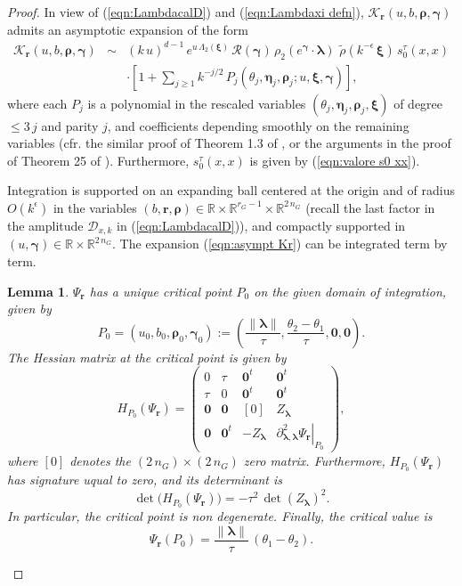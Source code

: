 \documentclass[12pt,a4paper]{article}
\theoremstyle{plain}
\newtheorem{lem}[thm]{Lemma}%
\theoremstyle{definition}
\begin{document}
\begin{proof}
In view of (\ref{eqn:LambdacalD}) and (\ref{eqn:Lambdaxi defn}),
$\mathcal{K}_{\mathbf{r}}\left(u,b,\boldsymbol{\rho},
\boldsymbol{\gamma} \right)$ admits an asymptotic expansion of the
form
\begin{eqnarray}
\label{eqn:asympt Kr}
\mathcal{K}_{\mathbf{r}}\left(u,b,\boldsymbol{\rho},
\boldsymbol{\gamma} \right)&\sim&(k\,u)^{d-1}\,
e^{u\,\Lambda_2 (\boldsymbol{\xi})}\,\mathcal{R}(\boldsymbol{\gamma})\,
\rho_2(e^{\boldsymbol{\gamma}}\cdot \boldsymbol{\lambda})\,
\,\tilde{\rho}\left(k^{-\epsilon}\,\boldsymbol{\xi}\right)\,
s_0^\tau(x,x)\nonumber\\
&&\cdot \left[1+\sum_{j\ge 1}k^{-j/2}\,P_j(\theta_j,\boldsymbol{\eta}_j,\boldsymbol{\rho}_j;u,
\boldsymbol{\xi},\boldsymbol{\gamma})\right],
\end{eqnarray}
where each $P_j$ is a polynomial in the rescaled variables
$(\theta_j,\boldsymbol{\eta}_j,\boldsymbol{\rho}_j,
\boldsymbol{\xi})$ of degree $\le 3\,j$ and parity $j$,
and coefficients depending smoothly on the remaining variables
(cfr. the similar proof of Theorem 1.3 of \cite{p22},
or the arguments in the proof of Theorem 25 of \cite{gp24}).
Furthermore, 
$s_0^\tau(x,x)$ is given by (\ref{eqn:valore s0 xx}).


Integration is supported on an expanding ball centered
at the origin and of radius $O\left(k^\epsilon\right)$ 
in the variables
$(b,\mathbf{r},\boldsymbol{\rho})\in \mathbb{R}\times 
\mathbb{R}^{r_G-1}\times \mathbb{R}^{2\,n_G}$
(recall the last factor in the amplitude
$\mathcal{D}_{x,k}$ in (\ref{eqn:LambdacalD})), and 
compactly supported in 
$(u,\boldsymbol{\gamma})\in \mathbb{R}\times \mathbb{R}^{2\,n_G}$.
The expansion (\ref{eqn:asympt Kr}) can be integrated term by term.

\begin{lem}
\label{lem:critical point Psi}
$\Psi_{\mathbf{r}}$ has a unique critical point
$P_0$ on the
given domain of integration, given by 
$$
P_0=\left(u_0,b_0,\boldsymbol{\rho}_0,
\boldsymbol{\gamma}_0 \right)
:=\left(\frac{\|\boldsymbol{\lambda}\|}{\tau},
\frac{\theta_2-\theta_1}{\tau},\mathbf{0},\mathbf{0}     \right).
$$
The Hessian matrix
at the critical point
is given by
$$
H_{P_0}(\Psi_{\mathbf{r}})=
\begin{pmatrix}
0   &\tau & \mathbf{0}^t  & \mathbf{0}^t   \\
\tau&0    &  \mathbf{0}^t & \mathbf{0}^t    \\
\mathbf{0}&  \mathbf{0}  &[0] & Z_{\boldsymbol{\lambda}}   \\
\mathbf{0}&  \mathbf{0}^t &-Z_{\boldsymbol{\lambda}} &
\left.
\partial_{\boldsymbol{\lambda},\boldsymbol{\lambda}}^2
\Psi_{\mathbf{r}}\right|_{P_0}
\end{pmatrix},
$$ 
where $[0]$ denotes the $(2\,n_G)\times (2\,n_G)$ 
zero matrix.
Furthermore, 
$H_{P_0}(\Psi_{\mathbf{r}})$ has signature 
uqual to zero, and its determinant is
$$
\det \big(H_{P_0}(\Psi_{\mathbf{r}})\big)=
-\tau^2\,\det\left(Z_{\boldsymbol{\lambda}}\right)^2.
$$
In particular, the critical point is non degenerate. Finally, the critical
value is
$$
\Psi_{\mathbf{r}}(P_0)=
\frac{\|\boldsymbol{\lambda}\|}{\tau}\,(\theta_1-\theta_2).
$$
\end{lem}


\end{proof}
\end{document}
